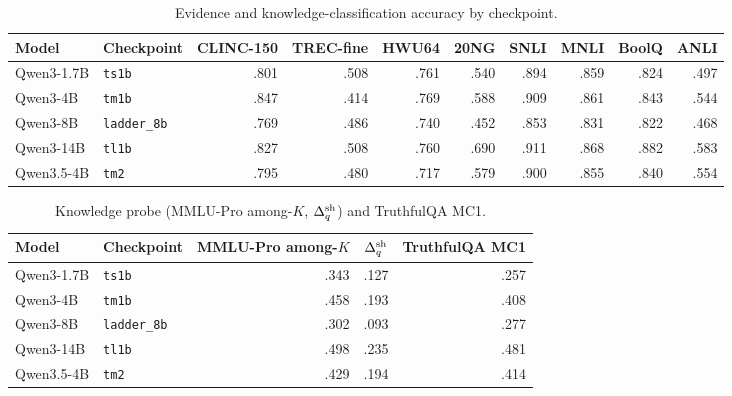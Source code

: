 \begin{table}[h]
  \centering
  \caption{Evidence and knowledge-classification accuracy by checkpoint.}
  \label{tab:app-evidence}
  \small
  \setlength{\tabcolsep}{3.5pt}
  \begin{tabular}{llrrrrrrrr}
    \toprule
    Model & Checkpoint & CLINC-150 & TREC-fine & HWU64 & 20NG & SNLI & MNLI & BoolQ & ANLI \\
    \midrule
    Qwen3-1.7B & \texttt{ts1b} & .801 & .508 & .761 & .540 & .894 & .859 & .824 & .497 \\
    Qwen3-4B & \texttt{tm1b} & .847 & .414 & .769 & .588 & .909 & .861 & .843 & .544 \\
    Qwen3-8B & \texttt{ladder\_8b} & .769 & .486 & .740 & .452 & .853 & .831 & .822 & .468 \\
    Qwen3-14B & \texttt{tl1b} & .827 & .508 & .760 & .690 & .911 & .868 & .882 & .583 \\
    Qwen3.5-4B & \texttt{tm2} & .795 & .480 & .717 & .579 & .900 & .855 & .840 & .554 \\
    \bottomrule
  \end{tabular}
\end{table}

\begin{table}[h]
  \centering
  \caption{Knowledge probe (MMLU-Pro among-$K$, $\Delta_q^{\mathrm{sh}}$) and TruthfulQA MC1.}
  \label{tab:app-knowledge}
  \small
  \begin{tabular}{llrrr}
    \toprule
    Model & Checkpoint & MMLU-Pro among-$K$ & $\Delta_q^{\mathrm{sh}}$ & TruthfulQA MC1 \\
    \midrule
    Qwen3-1.7B & \texttt{ts1b} & .343 & .127 & .257 \\
    Qwen3-4B & \texttt{tm1b} & .458 & .193 & .408 \\
    Qwen3-8B & \texttt{ladder\_8b} & .302 & .093 & .277 \\
    Qwen3-14B & \texttt{tl1b} & .498 & .235 & .481 \\
    Qwen3.5-4B & \texttt{tm2} & .429 & .194 & .414 \\
    \bottomrule
  \end{tabular}
\end{table}

